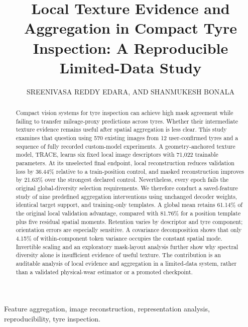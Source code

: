 \documentclass[nolineno]{ieeeaccess}
\begin{document}
\raggedbottom
\pagestyle{headings}
\history{}
\doi{}
\title{Local Texture Evidence and Aggregation in Compact Tyre Inspection: A Reproducible Limited-Data Study}
\author{\uppercase{Sreenivasa Reddy Edara}, AND
\uppercase{Shanmukesh Bonala}}
\address[1]{School of Computer Science and Engineering, VIT-AP University, Amaravati, India (e-mail: sreenivasareddy.e@vitap.ac.in)}
\address[2]{School of Computer Science and Engineering, VIT-AP University, Amaravati, India (e-mail: shanmukesh.23BCE20070@vitapstudent.ac.in)}
\begin{abstract}
Compact vision systems for tyre inspection can achieve high mask agreement while failing to transfer mileage-proxy predictions across tyres. Whether their intermediate texture evidence remains useful after spatial aggregation is less clear. This study examines that question using 570 existing images from 12 user-confirmed tyres and a sequence of fully recorded custom-model experiments. A geometry-anchored texture model, TRACE, learns six fixed local image descriptors with 71,022 trainable parameters. At its unselected final endpoint, local reconstruction reduces validation loss by 36.44\% relative to a train-position control, and masked reconstruction improves by 21.63\% over the strongest declared control. Nevertheless, every epoch fails the original global-diversity selection requirements. We therefore conduct a saved-feature study of nine predefined aggregation interventions using unchanged decoder weights, identical target support, and training-only templates. A global mean retains 61.14\% of the original local validation advantage, compared with 81.76\% for a position template plus five residual spatial moments. Retention varies by descriptor and tyre component; orientation errors are especially sensitive. A covariance decomposition shows that only 4.15\% of within-component token variance occupies the constant spatial mode. Invertible scaling and an exploratory mask-layout analysis further show why spectral diversity alone is insufficient evidence of useful texture. The contribution is an auditable analysis of local evidence and aggregation in a limited-data system, rather than a validated physical-wear estimator or a promoted checkpoint.
\end{abstract}
\begin{keywords}
Feature aggregation, image reconstruction, representation analysis, reproducibility, tyre inspection.
\end{keywords}
\titlepgskip=-21pt
\maketitle









\FloatBarrier
\end{document}
